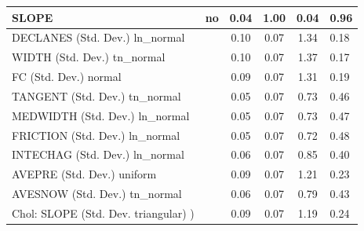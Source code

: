 \begin{table}
\begin{center}
\begin{tabular}{|l|l|c|c|c|l|}
			\hline
			SLOPE & no & 0.04 & 1.00 & 0.04 & 0.96 \\
			\hline
			DECLANES (Std. Dev.) ln_normal &  & 0.10 & 0.07 & 1.34 & 0.18 \\
			\hline
			WIDTH (Std. Dev.) tn_normal &  & 0.10 & 0.07 & 1.37 & 0.17 \\
			\hline
			FC (Std. Dev.) normal &  & 0.09 & 0.07 & 1.31 & 0.19 \\
			\hline
			TANGENT (Std. Dev.) tn_normal &  & 0.05 & 0.07 & 0.73 & 0.46 \\
			\hline
			MEDWIDTH (Std. Dev.) ln_normal &  & 0.05 & 0.07 & 0.73 & 0.47 \\
			\hline
			FRICTION (Std. Dev.) ln_normal &  & 0.05 & 0.07 & 0.72 & 0.48 \\
			\hline
			INTECHAG (Std. Dev.) ln_normal &  & 0.06 & 0.07 & 0.85 & 0.40 \\
			\hline
			AVEPRE (Std. Dev.) uniform &  & 0.09 & 0.07 & 1.21 & 0.23 \\
			\hline
			AVESNOW (Std. Dev.) tn_normal &  & 0.06 & 0.07 & 0.79 & 0.43 \\
			\hline
			 Chol: SLOPE (Std. Dev. triangular) ) &  & 0.09 & 0.07 & 1.19 & 0.24 \\
			\hline
		\end{tabular}
	\end{center}
\end{table}